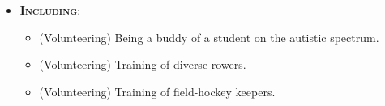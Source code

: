 \documentclass[11pt, a4paper]{article}
\begin{document}
\begin{minipage}[t]{0.9\textwidth}
\begin{itemize}
\begin{itemize}
            \item Taking a motivating role in a team (professionally and in sports).
        \end{itemize}
        \item \textbf{\textsc{Including}}:
        \begin{itemize}
            \item (Volunteering) Being a buddy of a student on the autistic spectrum.
            \item (Volunteering) Training of diverse rowers.
            \item (Volunteering) Training of field-hockey keepers.
        \end{itemize}
    \end{itemize}

\end{minipage}
\end{document}
